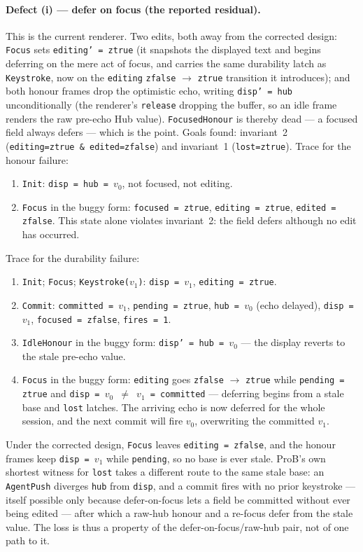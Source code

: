 \documentclass[a4paper,10pt,fleqn]{article}
\begin{document}
\paragraph{Defect (i) --- defer on focus (the reported residual).}
This is the current renderer.  Two edits, both away from the corrected design:
\texttt{Focus} sets \texttt{editing' = ztrue} (it snapshots the displayed text
and begins deferring on the mere act of focus, and carries the same durability
latch as \texttt{Keystroke}, now on the \texttt{editing} \texttt{zfalse} $\to$
\texttt{ztrue} transition it introduces); and both honour frames drop the
optimistic echo, writing \texttt{disp' = hub} unconditionally (the renderer's
\texttt{release} dropping the buffer, so an idle frame renders the raw pre-echo
Hub value).  \texttt{FocusedHonour} is thereby dead --- a focused field always
defers --- which is the point.  Goals found: invariant~2
(\texttt{editing=ztrue \& edited=zfalse}) and invariant~1 (\texttt{lost=ztrue}).
Trace for the honour failure:
\begin{enumerate}
  \item \texttt{Init}: \texttt{disp = hub = $v_0$}, not focused, not editing.
  \item \texttt{Focus} in the buggy form: \texttt{focused = ztrue},
    \texttt{editing = ztrue}, \texttt{edited = zfalse}.  This state alone
    violates invariant~2: the field defers although no edit has occurred.
\end{enumerate}
Trace for the durability failure:
\begin{enumerate}
  \item \texttt{Init}; \texttt{Focus}; \texttt{Keystroke($v_1$)}:
    \texttt{disp = $v_1$}, \texttt{editing = ztrue}.
  \item \texttt{Commit}: \texttt{committed = $v_1$}, \texttt{pending = ztrue},
    \texttt{hub = $v_0$} (echo delayed), \texttt{disp = $v_1$},
    \texttt{focused = zfalse}, \texttt{fires = 1}.
  \item \texttt{IdleHonour} in the buggy form: \texttt{disp' = hub = $v_0$} ---
    the display reverts to the stale pre-echo value.
  \item \texttt{Focus} in the buggy form: \texttt{editing} goes \texttt{zfalse}
    $\to$ \texttt{ztrue} while \texttt{pending = ztrue} and \texttt{disp = $v_0$
    $\neq$ $v_1$ = committed} --- deferring begins from a stale base and
    \texttt{lost} latches.  The arriving echo is now deferred for the whole
    session, and the next commit will fire $v_0$, overwriting the committed
    $v_1$.
\end{enumerate}
Under the corrected design, \texttt{Focus} leaves \texttt{editing = zfalse}, and
the honour frames keep \texttt{disp = $v_1$} while \texttt{pending}, so no base
is ever stale.  ProB's own shortest witness for \texttt{lost} takes a different
route to the same stale base: an \texttt{AgentPush} diverges \texttt{hub} from
\texttt{disp}, and a commit fires with no prior keystroke --- itself possible
only because defer-on-focus lets a field be committed without ever being edited
--- after which a raw-hub honour and a re-focus defer from the stale value.  The
loss is thus a property of the defer-on-focus/raw-hub pair, not of one path to
it.
\end{document}
